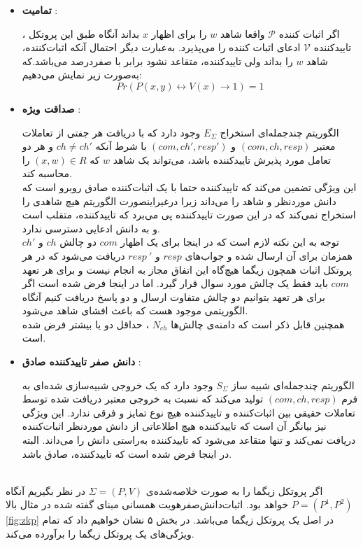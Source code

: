 \begin{itemize}
\item[]{\bf تمامیت }:
	
اگر اثبات کننده
$\mathcal{P}$
واقعا شاهد 
$w$
را برای اظهار
$x$
بداند آنگاه طبق این پروتکل ، تاییدکننده 
$\mathcal{V}$
ادعای اثبات کننده را می‌پذیرد. به‌عبارت دیگر احتمال آنکه اثبات‌کننده، شاهد
$w$
را بداند ولی تاییدکننده، متقاعد نشود برابر با صفردرصد می‌باشد.که به‌صورت زیر نمایش می‌دهیم:
$$ Pr(P(x,y) \leftrightarrow V(x) \rightarrow 1) = 1 $$
	
\item[]{\bf صداقت ویژه }:
	
 الگوریتم چندجمله‌ای استخراج
$E_{\Sigma}$
وجود دارد که با دریافت هر جفتی از تعاملات معتبر
$(com , ch , resp)$
و
$(com , ch' , resp')$
با شرط آنکه
$ch \ne ch'$
و هر دو تعامل مورد پذیرش تاییدکننده ‌باشد، 
می‌تواند یک شاهد 
$w$
 که  
$(x,w) \in R $
را محاسبه کند.
\\
این ویژگی تضمین می‌کند که تاییدکننده حتما با یک اثبات‌کننده صادق روبرو است که دانش موردنظر و شاهد را می‌داند زیرا درغیراینصورت الگوریتم هیچ شاهدی را استخراج نمی‌کند که در این صورت تاییدکننده پی می‌برد که تاییدکننده، متقلب است و به دانش ادعایی دسترسی ندارد.
\\
\remark
توجه به این نکته لازم است که در اینجا برای یک اظهار
$com$
دو چالش 
$ch$
و
$ch'$
همزمان برای آن ارسال شده و جواب‌های
$resp$
و
${resp~}'$
دریافت می‌شود که در هر پروتکل اثبات همچون زیگما هیچ‌گاه این اتفاق مجاز به انجام نیست و برای هر تعهد
$com$
باید  فقط یک چالش مورد سوال قرار گیرد. اما در اینجا فرض شده است اگر برای هر تعهد بتوانیم دو چالش متفاوت ارسال و دو پاسخ دریافت کنیم آنگاه الگوریتمی موجود هست که باعث افشای شاهد می‌شود.
\\
 همچنین قابل ذکر است که دامنه‌ی چالش‌ها
 $N_{ch}$
 ، حداقل دو یا بیشتر فرض شده است.
	
\item[]{\bf دانش صفر تاییدکننده صادق } :
	
 الگوریتم چندجمله‌ای شبیه ساز 
$S_{\Sigma}$
وجود دارد که یک خروجی شبیه‌سازی شده‌ای به فرم
$(com,ch,resp)$
تولید می‌کند که نسبت به خروجی معتبر دریافت شده توسط تعاملات حقیقی بین اثبات‌کننده و تاییدکننده هیچ  نوع تمایز و فرقی ندارد.
این ویژگی نیز بیانگر آن است که تاییدکننده هیچ اطلاعاتی از دانش موردنظر  اثبات‌کننده دریافت نمی‌کند و تنها متقاعد می‌شود که تاییدکننده به‌راستی دانش را می‌داند. البته در اینجا فرض شده است که تاییدکننده، صادق باشد.
\end{itemize}~
\\
\remark
اگر پروتکل زیگما را به صورت خلاصه‌شده‌ی
$\Sigma = (P,V)$
در نظر بگیریم آنگاه
$P = (P^1,P^2)$
خواهد بود.
\remark
اثبات‌دانش‌صفر‌هویت  همسانی ‌مبنای گفته شده در مثال بالا
\ref{fig:zkp}
 در اصل یک پروتکل زیگما می‌باشد. در بخش ۵ نشان خواهیم داد که تمام ویژگی‌های یک پروتکل زیگما را برآورده می‌کند. 
\\

